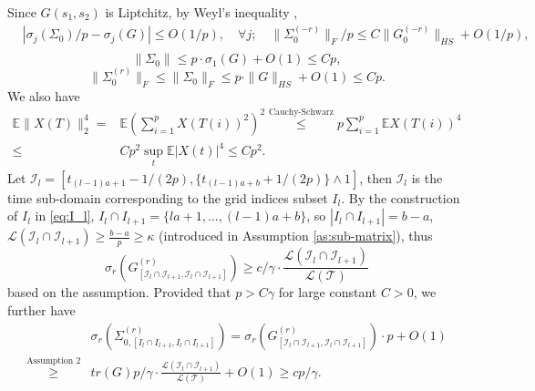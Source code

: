 \documentclass[11pt]{article}
\newcommand{\0}{{\mathbf{0}}}
\newcommand{\1}{{\mathbf{1}}}
\begin{document}
\begin{enumerate}[leftmargin=*]
	Since $G(s_1, s_2)$ is Liptchitz, by Weyl's inequality \citep{weyl1949inequalities},
	\begin{equation}\label{ineq:liptchitz-1}
	\begin{split}
	& |\sigma_j(\Sigma_0)/p - \sigma_j(G)|\leq O(1/p), \quad \forall j; \quad \|\Sigma_0^{(-r)}\|_F/p \leq C\|G_0^{(-r)}\|_{HS} + O(1/p),\\
	\end{split}
	\end{equation}
	\begin{equation}\label{ineq:Sigma_0-spectral-norm}
	\|\Sigma_0\| \leq p\cdot \sigma_1(G) + O(1) \leq Cp,
	\end{equation}
	\begin{equation}\label{ineq:liptchitz-2}
	\|\Sigma_0^{(r)}\|_F \leq \|\Sigma_0\|_F \leq p\cdot \|G\|_{HS} + O(1) \leq Cp.
	\end{equation}
	We also have 
	\begin{equation}\label{eq:EX(t)^4}
	\begin{split}
	\mathbb{E}\|X(T)\|_2^4 = & \mathbb{E}\left(\sum_{i=1}^p X(T(i))^2 \right)^2 \overset{\text{Cauchy-Schwarz}}{\leq} p\sum_{i=1}^p \mathbb{E} X(T(i))^4\\
	\leq &  Cp^2\sup_t\mathbb{E}|X(t)|^4 \leq Cp^2.
	\end{split}
	\end{equation}
	Let $\mathcal{I}_l = [t_{(l-1)a+1} - 1/(2p), \{t_{(l-1)a+b} + 1/(2p)\}\wedge 1]$, then $\mathcal{I}_l$ is the time sub-domain corresponding to the grid indices subset $I_l$. By the construction of $I_l$ in \eqref{eq:I_l}, $I_l \cap I_{l+1} = \{la+1,\ldots, (l-1)a + b\}$, so $|I_l \cap I_{l+1}| = b-a$, $\mathcal{L}(\mathcal{I}_l \cap \mathcal{I}_{l+1}) \geq \frac{b-a}{p} \geq \kappa$ (introduced in Assumption \ref{as:sub-matrix}), thus 
	$$\sigma_r(G^{(r)}_{[\mathcal{I}_l \cap \mathcal{I}_{l+1}, \mathcal{I}_l \cap \mathcal{I}_{l+1}]})\geq c/\gamma \cdot \frac{\mathcal{L}(\mathcal{I}_l \cap \mathcal{I}_{l+1})}{\mathcal{L}(\mathcal{T})}$$ 
	based on the assumption. Provided that $p>C\gamma$ for large constant $C>0$, we further have
	\begin{equation}\label{ineq:sigma_r-Sigma_l}
	\begin{split}
	& \sigma_r\left(\Sigma^{(r)}_{0, [I_l\cap I_{l+1}, I_l \cap I_{l+1}]}\right) = \sigma_r\left(G^{(r)}_{[\mathcal{I}_l \cap \mathcal{I}_{l+1}, \mathcal{I}_l \cap \mathcal{I}_{l+1}]}\right)\cdot p + O(1)\\
	\overset{\text{Assumption 2}}{\geq} & tr(G) p/\gamma \cdot \frac{\mathcal{L}(\mathcal{I}_l\cap \mathcal{I}_{l+1})}{\mathcal{L}(\mathcal{T})} + O(1) \geq cp/\gamma. 

\end{split}
\end{equation}
\end{enumerate}
\end{document}
